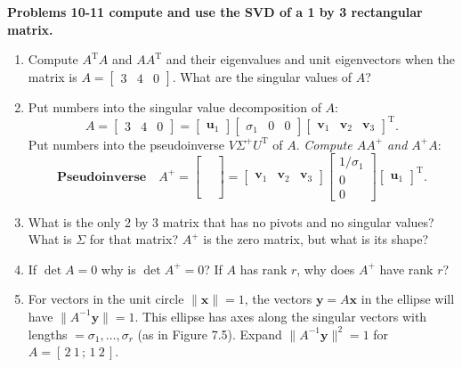 \documentclass[14pt, a4paper]{article}
\begin{document}
\noindent \textbf{Problems 10-11 compute and use the SVD of a 1 by 3 rectangular matrix.}
\begin{enumerate}[resume]
    \item Compute $A^{\mathrm{T}}A$ and $AA^{\mathrm{T}}$ and their eigenvalues and unit eigenvectors when the matrix is $A = \begin{bmatrix} 3 & 4 & 0 \end{bmatrix}$. What are the singular values of $A$?

    \item Put numbers into the singular value decomposition of $A$:
          \[
              A = \begin{bmatrix} 3 & 4 & 0 \end{bmatrix} = \begin{bmatrix} \boldsymbol{u}_1 \end{bmatrix} \begin{bmatrix} \sigma_1 & 0 & 0 \end{bmatrix} \begin{bmatrix} \boldsymbol{v}_1 & \boldsymbol{v}_2 & \boldsymbol{v}_3 \end{bmatrix}^{\mathrm{T}}.
          \]
          Put numbers into the pseudoinverse $V\Sigma^+U^{\mathrm{T}}$ of $A$. \textit{Compute $AA^+$ and $A^+A$}:
          \[
              \textbf{Pseudoinverse} \quad A^+ = \begin{bmatrix} \phantom{0} \\ \phantom{0} \\ \phantom{0} \end{bmatrix} = \begin{bmatrix} \boldsymbol{v}_1 & \boldsymbol{v}_2 & \boldsymbol{v}_3 \end{bmatrix} \begin{bmatrix} 1/\sigma_1 \\ 0 \\ 0 \end{bmatrix} \begin{bmatrix} \boldsymbol{u}_1 \end{bmatrix}^{\mathrm{T}}.
          \]

    \item What is the only 2 by 3 matrix that has no pivots and no singular values? What is $\Sigma$ for that matrix? $A^+$ is the zero matrix, but what is its shape?

    \item If $\det A = 0$ why is $\det A^+ = 0$? If $A$ has rank $r$, why does $A^+$ have rank $r$?

    \item For vectors in the unit circle $\|\boldsymbol{x}\| = 1$, the vectors $\boldsymbol{y} = A\boldsymbol{x}$ in the ellipse will have $\|A^{-1}\boldsymbol{y}\| = 1$. This ellipse has axes along the singular vectors with lengths $= \sigma_1, \dots, \sigma_r$ (as in Figure 7.5). Expand $\|A^{-1}\boldsymbol{y}\|^2 = 1$ for $A = [\,2\ 1\,;\,1\ 2\,]$.
\end{enumerate}
\end{document}
